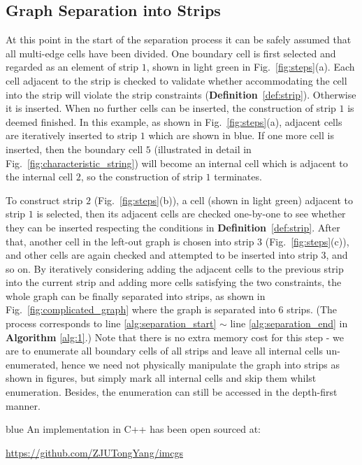 \documentclass[journal]{IEEEtran}
\begin{document}


\subsection{Graph Separation into Strips}
At this point in the start of the separation process it can be safely assumed that all multi-edge cells have been divided. 
One boundary cell is first selected and regarded as an element of strip $1$, shown in light green in Fig.~\ref{fig:steps}(a).
Each cell adjacent to the strip is checked to validate whether accommodating the cell into the strip will violate the strip constraints (\textbf{Definition}~\ref{def:strip}). Otherwise it is inserted. 
When no further cells can be inserted, the construction of strip $1$ is deemed finished. 
In this example, as shown in Fig.~\ref{fig:steps}(a), adjacent cells are iteratively inserted to strip $1$ which are shown in blue. If one more cell is inserted, then the boundary cell $5$ (illustrated in detail in Fig.~\ref{fig:characteristic_string}) will become an internal cell which is adjacent to the internal cell $2$, so the construction of strip $1$ terminates.  

To construct strip $2$ (Fig.~\ref{fig:steps}(b)), a cell (shown in light green) adjacent to strip $1$ is selected, then its adjacent cells are checked one-by-one to see whether they can be inserted respecting the conditions in \textbf{Definition}~\ref{def:strip}. 
After that, another cell in the left-out graph is chosen into strip $3$ (Fig.~\ref{fig:steps}(c)), and other cells are again checked and attempted to be inserted into strip $3$, and so on. 
By iteratively considering adding the adjacent cells to the previous strip into the current strip and adding more cells satisfying the two constraints, 
the whole graph can be finally separated into strips, as shown in Fig.~\ref{fig:complicated_graph} where the graph is separated into $6$ strips. (The process corresponds to line \ref{alg:separation_start} $\sim$ line \ref{alg:separation_end} in \textbf{Algorithm} \ref{alg:1}.) 
Note that there is no extra memory cost for this step - we are to enumerate all boundary cells of all strips and leave all internal cells un-enumerated, hence we need not physically manipulate the graph into strips as shown in figures, but simply mark all internal cells and skip them whilst enumeration. 
Besides, the enumeration can still be accessed in the depth-first manner. 
\begin{color}{blue}
An implementation in C++ has been open sourced at: 

\url{https://github.com/ZJUTongYang/imcgs}
\end{color}
\end{document}
